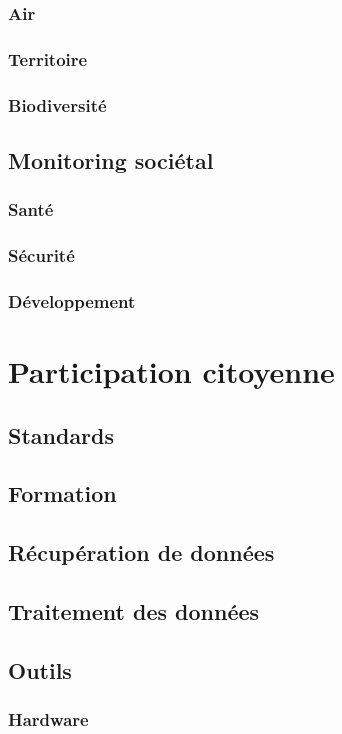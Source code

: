 \documentclass[10pt, conference, compsocconf]{llncs}
\begin{document}
\subsubsection{Air}
\subsubsection{Territoire}
\subsubsection{Biodiversité}

\subsection{Monitoring sociétal}
\subsubsection{Santé}
\subsubsection{Sécurité}
\subsubsection{Développement}

\section{Participation citoyenne}
\subsection{Standards}
\subsection{Formation}
\subsection{Récupération de données}
\subsection{Traitement des données}
\subsection{Outils}
\subsubsection{Hardware}
\end{document}
